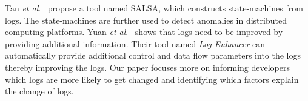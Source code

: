Tan \textsl{et al}$ . $~\cite{TanSalsa} propose a tool named SALSA, which constructs state-machines from logs. The state-machines are further used to detect anomalies in distributed computing platforms. Yuan\textsl{ et al$ . $}~\cite{Yuan} shows that logs need to be improved by providing additional information. Their tool named \emph{Log Enhancer} can automatically provide additional control and data flow parameters into the logs thereby improving the logs. Our paper focuses more on informing developers which logs are more likely to get changed and identifying which factors explain the change of logs. 






